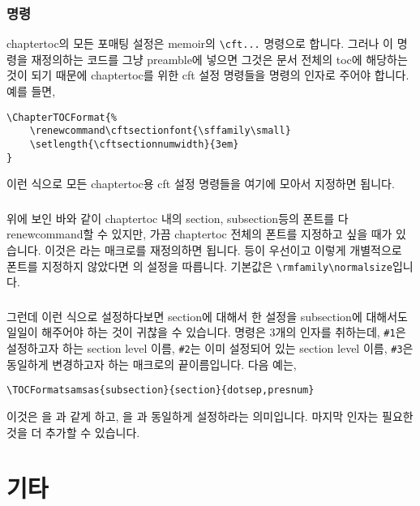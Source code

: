 \documentclass[chapter,a4paper,oneside,colorlinks]{oblivoir}
\renewcommand*\cftsectionfont{\hfill}
\begin{document}
\subsection{ 명령}

chaptertoc의 모든 포매팅 설정은 memoir의 \verb|\cft...| 명령으로 합니다. 그러나 이 명령을 재정의하는 코드를 그냥 preamble에 넣으면 그것은 문서 전체의 toc에 해당하는 것이 되기 때문에 chaptertoc를 위한 cft 설정 명령들을  명령의 인자로 주어야 합니다. 예를 들면,
\begin{Verbatim}[baselinestretch=1.05]
\ChapterTOCFormat{%
	\renewcommand\cftsectionfont{\sffamily\small}
	\setlength{\cftsectionnumwidth}{3em}
}
\end{Verbatim}
이런 식으로 모든 chaptertoc용 cft 설정 명령들을 여기에 모아서 지정하면 됩니다.

\subsection{}

위에 보인 바와 같이 chaptertoc 내의 section, subsection등의 폰트를 다 renewcommand할 수 있지만, 가끔 chaptertoc 전체의 폰트를 지정하고 싶을 때가 있습니다. 이것은 라는 매크로를 재정의하면 됩니다.  등이 우선이고 이렇게 개별적으로 폰트를 지정하지 않았다면 의 설정을 따릅니다. 기본값은 \verb|\rmfamily\normalsize|입니다.

\subsection{}

그런데 이런 식으로 설정하다보면 section에 대해서 한 설정을 subsection에 대해서도 일일이 해주어야 하는 것이 귀찮을 수 있습니다.  명령은 3개의 인자를 취하는데, \verb|#1|은 설정하고자 하는 section level 이름, \verb|#2|는 이미 설정되어 있는 section level 이름, \verb|#3|은 동일하게 변경하고자 하는 매크로의 끝이름입니다. 다음 예는,
\begin{Verbatim}[baselinestretch=1.05]
\TOCFormatsamsas{subsection}{section}{dotsep,presnum}
\end{Verbatim}
이것은 을 과 같게 하고, 을 과 동일하게 설정하라는 의미입니다. 마지막 인자는 필요한 것을 더 추가할 수 있습니다.


\chapter{기타}
\end{document}
